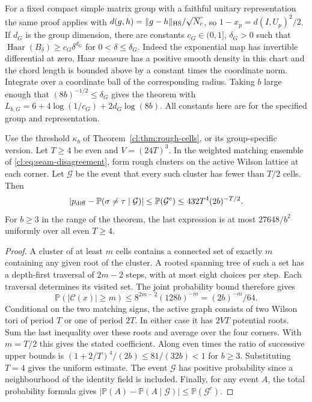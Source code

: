 For a fixed compact simple matrix group with a faithful unitary
representation the same proof applies with
$d(g,h)=\|g-h\|_{\rm HS}/\sqrt{N_c}$, so
$1-x_p=d(I,U_p)^2/2$. If $d_G$ is the group dimension, there are constants
$c_G\in(0,1]$, $\delta_G>0$ such that
$\operatorname{Haar}(B_\delta)\ge c_G\delta^{d_G}$ for
$0<\delta\le\delta_G$. Indeed the exponential map has invertible
differential at zero, Haar measure has a positive smooth density in
this chart and the chord length is bounded above by a constant times
the coordinate norm. Integrate over a coordinate ball of the
corresponding radius. Taking $b$ large enough that
$(8b)^{-1/2}\le\delta_G$ gives the theorem with
$L_{b,G}=6+4\log(1/c_G)+2d_G\log(8b)$.
All constants here are for the specified group and representation.

\begin{corollary}\label{cl:cor:seam-clusters}
Use the threshold $\kappa_b$ of Theorem~\ref{cl:thm:rough-cells}, or its
group-specific version. Let $T\ge4$ be even and $V=(24T)^3$.
In the weighted matching ensemble of \eqref{cl:eq:seam-disagreement},
form rough clusters on the active Wilson lattice at each corner. Let
$\mathcal G$ be the event that every such cluster has fewer than $T/2$
cells. Then
\[
 \left|p_{\rm diff}-
   {\mathbb P}(\sigma\ne\tau\mid\mathcal G)\right|
 \le {\mathbb P}(\mathcal G^c)
 \le 432 T^4(2b)^{-T/2}.
\]
For $b\ge3$ in the range of the theorem, the last expression is at
most $27648/b^2$ uniformly over all even $T\ge4$.
\end{corollary}

\begin{proof}
A cluster of at least $m$ cells contains a connected set of exactly $m$
containing any given root of the cluster. A rooted spanning tree of such a
set has a depth-first traversal of $2m-2$ steps, with at most eight choices
per step. Each traversal determines its visited set. The joint probability
bound therefore gives
\[
 {\mathbb P}(|\mathcal C(x)|\ge m)
 \le 8^{2m-2}(128b)^{-m}=(2b)^{-m}/64.
\]
Conditional on the two matching signs, the active graph consists of
two Wilson tori of period $T$ or one of period $2T$. In either case it
has $2VT$ potential roots. Sum the last inequality over these roots and
average over the four corners. With $m=T/2$ this gives the stated
coefficient. Along even times the ratio of successive upper bounds is
$(1+2/T)^4/(2b)\le81/(32b)<1$ for $b\ge3$. Substituting $T=4$ gives the
uniform estimate. The event $\mathcal G$ has positive probability since a
neighbourhood of the identity field is included. Finally, for any event
$A$, the total probability formula gives
$|{\mathbb P}(A)-{\mathbb P}(A\mid\mathcal G)|\le{\mathbb P}(\mathcal G^c)$.
\end{proof}

